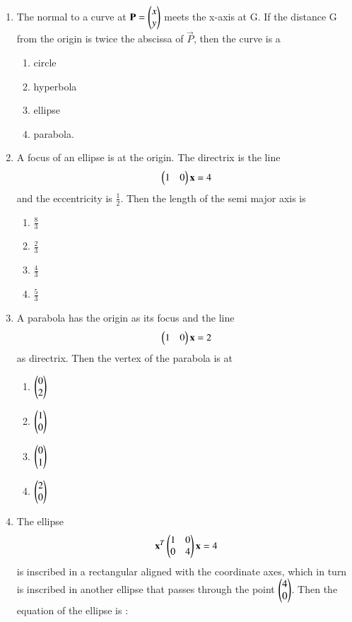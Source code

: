 \begin{enumerate}[label=\arabic*.,ref=\thesubsection.\theenumi]
    \item The normal to a curve at $\mathbf{P}=\begin{pmatrix}x\\y\end{pmatrix}$ meets the x-axis at G. If the distance G from the origin is twice the abscissa of $\vec{P}$, then the curve is a
    \begin{enumerate}
    \item circle
    \item hyperbola 
    \item ellipse
    \item parabola. 
    \end{enumerate}
    \item A focus of an ellipse is at the origin. The directrix is the line 
    \begin{align}
    \begin{pmatrix}1&0\end{pmatrix}\mathbf{x}=4
    \end{align} and the eccentricity is $\frac{1}{2}$. Then the length of the semi major axis is 
    \begin{enumerate}
    \item $\frac{8}{3}$
    \item $\frac{2}{3}$
    \item $\frac{4}{3}$
    \item $\frac{5}{3}$
    \end{enumerate}
    \item A parabola has the origin as its focus and the line
    \begin{align}
    \begin{pmatrix}1&0\end{pmatrix}\mathbf{x}=2
    \end{align} as directrix. Then the vertex of the parabola is at 
    \begin{enumerate}
    \item $\begin{pmatrix}0\\2\end{pmatrix}$
    \item $\begin{pmatrix}1\\0\end{pmatrix}$ 
    \item $\begin{pmatrix}0\\1\end{pmatrix}$
    \item $\begin{pmatrix}2\\0\end{pmatrix}$ 
    \end{enumerate}
    \item The ellipse
    \begin{align}
    \mathbf{x}^T\begin{pmatrix}1&0\\0&4\end{pmatrix}\mathbf{x}=4
    \end{align} is inscribed in a rectangular aligned with the coordinate axes, which in turn is inscribed in another ellipse that passes through the point $\begin{pmatrix}4\\0\end{pmatrix}$. Then the equation of the ellipse is :

\end{enumerate}
